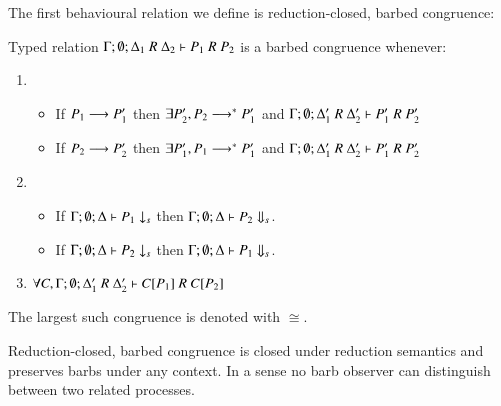 The first behavioural relation we define is reduction-closed, barbed congruence:
%
\begin{definition}\rm
	Typed relation
	$\horel{\Gamma}{\Delta_1}{P_1}{\ R\ }{\Delta_2}{P_2}$
	is a barbed congruence whenever:
	\begin{enumerate}
		\item
		\begin{itemize}
			\item	If $P_1 \longrightarrow P_1'$ then $\exists P_2', P_2 \longrightarrow^* P_1'$ and
				$\horel{\Gamma}{\Delta_1'}{P_1'}{\ R\ }{\Delta_2'}{P_2'}$
			\item	If $P_2 \longrightarrow P_2'$ then $\exists P_1', P_1 \longrightarrow^* P_1'$ and
				$\horel{\Gamma}{\Delta_1'}{P_1'}{\ R\ }{\Delta_2'}{P_2'}$
		\end{itemize}

		\item
		\begin{itemize}
			\item	If $\Gamma;\emptyset;\Delta \vdash P_1 \downarrow_{s}$ then $\Gamma;\emptyset;\Delta \vdash P_2 \Downarrow_{s}$.
			\item	If $\Gamma;\emptyset;\Delta \vdash P_2 \downarrow_{s}$ then $\Gamma;\emptyset;\Delta \vdash P_1 \Downarrow_{s}$.
		\end{itemize}

		\item	$\forall C, \horel{\Gamma}{\Delta_1'}{\context{C}{P_1}}{\ R\ }{\Delta_2'}{\context{C}{P_2}}$
	\end{enumerate}
	The largest such congruence is denoted with $\cong$.
\end{definition}
%
Reduction-closed, barbed congruence is closed under reduction semantics and 
preserves barbs under any context. In a sense no barb observer can distinguish
between two related processes.

